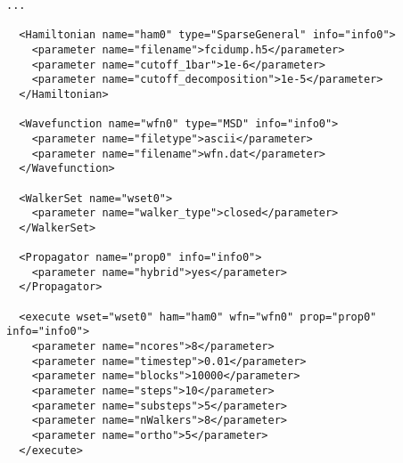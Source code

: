 \begin{lstlisting}[style=QMCPXML,caption=Example of sections of an AFQMC input file for a large calculation.]
...

  <Hamiltonian name="ham0" type="SparseGeneral" info="info0">
    <parameter name="filename">fcidump.h5</parameter>
    <parameter name="cutoff_1bar">1e-6</parameter>
    <parameter name="cutoff_decomposition">1e-5</parameter>
  </Hamiltonian>

  <Wavefunction name="wfn0" type="MSD" info="info0">
    <parameter name="filetype">ascii</parameter>
    <parameter name="filename">wfn.dat</parameter>
  </Wavefunction>

  <WalkerSet name="wset0">
    <parameter name="walker_type">closed</parameter>
  </WalkerSet>

  <Propagator name="prop0" info="info0">
    <parameter name="hybrid">yes</parameter>
  </Propagator>

  <execute wset="wset0" ham="ham0" wfn="wfn0" prop="prop0" info="info0">
    <parameter name="ncores">8</parameter>
    <parameter name="timestep">0.01</parameter>
    <parameter name="blocks">10000</parameter>
    <parameter name="steps">10</parameter>
    <parameter name="substeps">5</parameter>
    <parameter name="nWalkers">8</parameter>
    <parameter name="ortho">5</parameter>
  </execute>
\end{lstlisting}
